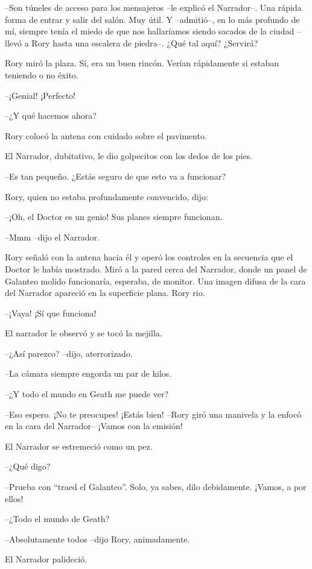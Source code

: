 {--Son túneles de acceso para los mensajeros --le explicó el
	Narrador--. Una rápida forma de entrar y salir del salón. Muy útil. Y
	--admitió--, en lo más profundo de mí, siempre tenía el miedo de que nos
	hallaríamos siendo sacados de la ciudad --llevó a Rory hasta una
escalera de piedra--. ¿Qué tal aquí? ¿Servirá?}

{Rory miró la plaza. Sí, era un buen rincón. Verían rápidamente si
estaban teniendo o no éxito.}

{--¡Genial! ¡Perfecto!}

{--¿Y qué hacemos ahora?}

{Rory colocó la antena con cuidado sobre el pavimento.}

{El Narrador, dubitativo, le dio golpecitos con los dedos de los pies.}

{--Es tan pequeño. ¿Estás seguro de que esto va a funcionar?}

{Rory, quien no estaba profundamente convencido, dijo:}

{--¡Oh, el Doctor es un genio! Sus planes siempre funcionan.}

{--Mmm --dijo el Narrador.}

{Rory señaló con la antena hacia él y operó los controles en la
	secuencia que el Doctor le había mostrado. Miró a la pared cerca del
	Narrador, donde un panel de Galanteo molido funcionaría, esperaba, de
	monitor. Una imagen difusa de la cara del Narrador apareció en la
superficie plana. Rory rio.}

{--¡Vaya! ¡Sí que funciona!}

{El narrador le observó y se tocó la mejilla.}

{--¿Así parezco? --dijo, aterrorizado.}

{--La cámara siempre engorda un par de kilos.}

{--¿Y todo el mundo en Geath me puede ver?}

{--Eso espero. ¡No te preocupes! ¡Estás bien! --Rory giró una manivela
y la enfocó en la cara del Narrador-- ¡Vamos con la emisión!}

{El Narrador se estremeció como un pez.}

{--¿Qué digo?}

{--Prueba con ``traed el Galanteo''. Solo, ya sabes, dilo debidamente.
¡Vamos, a por ellos!}

{--¿Todo el mundo de Geath?}

{--Absolutamente todos --dijo Rory, animadamente.}

{El Narrador palideció.}

